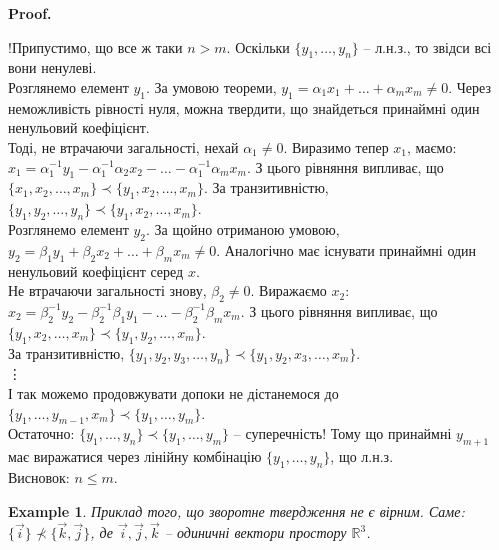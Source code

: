 \documentclass[a4paper, 10pt]{article}
\makeatletter
\theoremstyle{theoremdd}
\newtheorem{example}[theorem]{Example}
\renewenvironment{proof}[1][Proof.\\]{\par
\pushQED{\hfill \qed}%
\normalfont \topsep6\p@\@plus6\p@\relax
\trivlist
\item\relax
{\bfseries
#1\@addpunct{.}}\hspace\labelsep\ignorespaces
}{%
\popQED\endtrivlist\@endpefalse
}
\makeatother
\begin{document}
	\begin{proof}
	!Припустимо, що все ж таки $n > m$. Оскільки $\{y_1,\dots,y_n\}$ -- л.н.з., то звідси всі вони ненулеві.\\
Розглянемо елемент $y_1$. За умовою теореми, $y_1 = \alpha_1 x_1 + \dots + \alpha_m x_m \neq 0$. Через неможливість рівності нуля, можна твердити, що знайдеться принаймні один ненульовий коефіцієнт.\\
Тоді, не втрачаючи загальності, нехай $\alpha_1 \neq 0$. Виразимо тепер $x_1$, маємо:\\
$x_1 = \alpha_1^{-1}y_1 - \alpha_1^{-1}\alpha_2 x_2 - \dots - \alpha_1^{-1} \alpha_m x_m$. З цього рівняння випливає, що $\{x_1, x_2, \dots,x_m\} \prec \{y_1, x_2, \dots,x_m\}$. За транзитивністю, $\{y_1,y_2,\dots,y_n \} \prec \{y_1,x_2,\dots,x_m \}$.\\
Розглянемо елемент $y_2$. За щойно отриманою умовою, $y_2 = \beta_1 y_1 + \beta_2 x_2 + \dots + \beta_m x_m \neq 0$. Аналогічно має існувати принаймні один ненульовий коефіцієнт серед $x$. \\
Не втрачаючи загальності знову, $\beta_2 \neq 0$. Виражаємо $x_2$:\\
$x_2 = \beta_2^{-1}y_2 - \beta_2^{-1}\beta_1 y_1 - \dots - \beta_2^{-1} \beta_m x_m$. З цього рівняння випливає, що $\{y_1,x_2,\dots,x_m\} \prec \{y_1,y_2,\dots,x_m\}$.\\
За транзитивністю, $\{y_1,y_2,y_3,\dots,y_n\} \prec \{y_1,y_2,x_3,\dots,x_m\}$.\\
\vdots \\
І так можемо продовжувати допоки не дістанемося до $\{y_1,\dots, y_{m-1}, x_m\} \prec \{y_1,\dots,y_m\}$.\\
Остаточно: $\{y_1,\dots,y_n\} \prec \{y_1,\dots,y_m\}$ -- суперечність! Тому що принаймні $y_{m+1}$ має виражатися через лінійну комбінацію $\{y_1,\dots,y_n\}$, що л.н.з.\\
Висновок: $n \leq m$.
	\end{proof}
	
	\begin{example}
	Приклад того, що зворотне твердження не є вірним. Саме:\\ 
	$\{\vec{i}\} \not\prec \{\vec{k}, \vec{j}\}$, де $\vec{i},\vec{j},\vec{k}$ -- одиничні вектори простору $\mathbb{R}^3$.
	\end{example}
	
\end{document}
